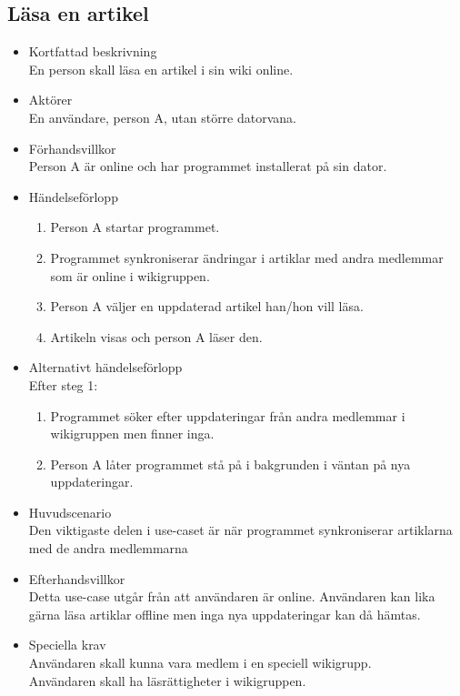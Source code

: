 \subsection{Läsa en artikel}
\begin{itemize}
	\item Kortfattad beskrivning
	\\En person skall läsa en artikel i sin wiki online.
	\item Aktörer
	\\En användare, person A, utan större datorvana.
	\item Förhandsvillkor
	\\Person A är online och har programmet installerat på sin dator.
	\item Händelseförlopp
	\begin{enumerate}
		\item Person A startar programmet.
		\item Programmet synkroniserar ändringar i artiklar med andra medlemmar som är online i wikigruppen.
		\item Person A väljer en uppdaterad artikel han/hon vill läsa.
		\item Artikeln visas och person A läser den.
	\end{enumerate}
	\item Alternativt händelseförlopp
	\\Efter steg 1:
	\begin{enumerate}	
		\item Programmet söker efter uppdateringar från andra medlemmar i wikigruppen men finner inga.
		\item Person A låter programmet stå på i bakgrunden i väntan på nya uppdateringar.	
	\end{enumerate}	
	\item Huvudscenario
	\\Den viktigaste delen i use-caset är när programmet synkroniserar artiklarna med de andra medlemmarna
	\item Efterhandsvillkor
	\\Detta use-case utgår från att användaren är online. Användaren kan lika gärna läsa artiklar offline men inga nya uppdateringar kan då hämtas.
	\item Speciella krav
	\\Användaren skall kunna vara medlem i en speciell wikigrupp.
	\\Användaren skall ha läsrättigheter i wikigruppen.
\end{itemize}

